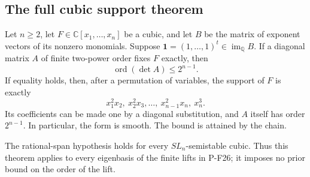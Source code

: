 \subsection{The full cubic support theorem}

\begin{theorem}
\label{thm:fullcubicsupport}
Let $n\ge2$, let $F\in\mathbb C[x_1,\ldots,x_n]$ be
a cubic, and let $B$ be the matrix of exponent vectors
of its nonzero monomials. Suppose
$\mathbf1=(1,\ldots,1)^t\in\operatorname{im}_{\mathbb Q}B$.
If a diagonal matrix $A$ of finite two-power order
fixes $F$ exactly, then
\[
 \operatorname{ord}(\det A)\le2^{n-1}.
 \tag{P-F30a}
\]
If equality holds, then, after a permutation of variables,
the support of $F$ is exactly
\[
 x_1^2x_2,\ x_2^2x_3,\ldots,\ x_{n-1}^2x_n,\ x_n^3.
 \tag{P-F30b}
\]
Its coefficients can be made one by a diagonal substitution,
and $A$ itself has order $2^{n-1}$. In particular, the
form is smooth. The bound is attained by the chain.

The rational-span hypothesis holds for every
$SL_n$-semistable cubic. Thus this theorem applies
to every eigenbasis of the finite lifts in P-F26;
it imposes no prior bound on the order of the lift.
\end{theorem}

